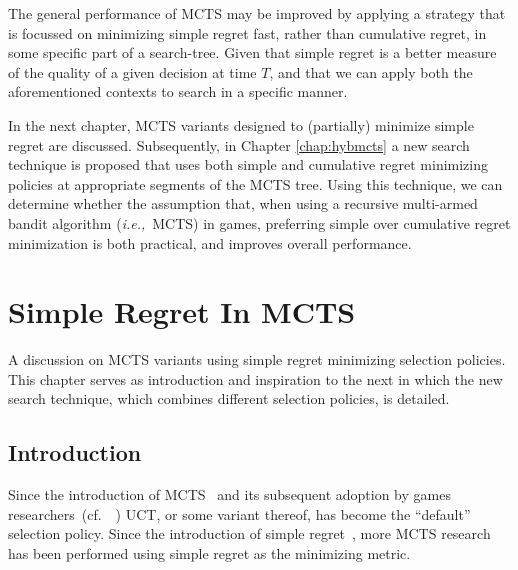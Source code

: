 \documentclass{kecsmstr}
\newcommand{\ie}{{\it i.e.,}~}
\newcommand{\cf}{{cf.}~}
\begin{document}
The general performance of MCTS may be improved by applying a strategy that is focussed on minimizing simple regret fast, rather than cumulative regret, in some specific part of a search-tree. Given that simple regret is a better measure of the quality of a given decision at time $T$, and that we can apply both the aforementioned contexts to search in a specific manner. 

In the next chapter, MCTS variants designed to (partially) minimize simple regret are discussed. Subsequently, in Chapter \ref{chap:hybmcts} a new search technique is proposed that uses both simple and cumulative regret minimizing policies at appropriate segments of the MCTS tree. Using this technique, we can determine whether the assumption that, when using a recursive multi-armed bandit algorithm (\ie MCTS) in games, preferring simple over cumulative regret minimization is both practical, and improves overall performance.

\chapter{Simple Regret In MCTS}
\label{chap:mctssr}

\begin{chaptercontents} A discussion on MCTS variants using simple regret minimizing selection policies. This chapter serves as introduction and inspiration to the next in which the new search technique, which combines different selection policies, is detailed.
\end{chaptercontents}

\section{Introduction}
Since the introduction of MCTS~ and its subsequent adoption by games researchers~(\cf~) UCT, or some variant thereof, has become the ``default'' selection policy. Since the introduction of simple regret~, more MCTS research has been performed using simple regret as the minimizing metric.
\end{document}
